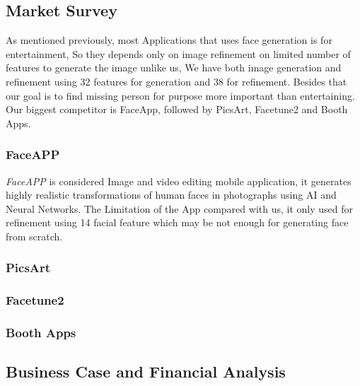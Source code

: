 \subsection{Market Survey}

As mentioned previously, most Applications that uses face generation is for entertainment, So they depends only on image refinement on limited number of features to generate the image unlike us, We have both image generation and refinement using 32 features for generation and 38 for refinement.
Besides that our goal is to find missing person for purpose more important than entertaining. Our biggest competitor is FaceApp, followed by PicsArt, Facetune2 and Booth Apps.
  

\subsubsection{FaceAPP}
\emph{FaceAPP} is considered Image and video editing mobile application, it generates highly realistic transformations of human faces in photographs using AI and Neural Networks. 
The Limitation of the App compared with us, it only used for refinement using 14 facial feature which may be not enough for generating face from scratch.

\subsubsection{PicsArt}

\subsubsection{Facetune2}

\subsubsection{Booth Apps}

\subsection{Business Case and Financial Analysis }
